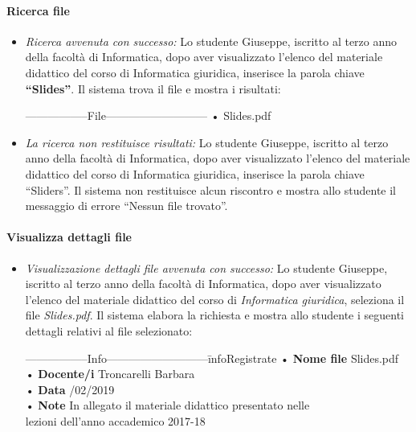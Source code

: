 \paragraph{Ricerca file}
\begin{itemize}
	\item \textit{Ricerca avvenuta con successo:}
	Lo studente Giuseppe, iscritto al terzo anno della  facoltà di Informatica, dopo aver visualizzato l’elenco del materiale didattico del corso di Informatica giuridica, inserisce la parola chiave \textbf{“Slides”}. Il sistema trova il file e mostra i risultati:   
	\begin{tabbing}
		\hspace{1cm}-----------------File---------------------------\kill
		\hspace{1cm} • Slides.pdf  \\
	\end{tabbing} 
	
	\item \textit{La ricerca non restituisce risultati:}
	Lo studente Giuseppe, iscritto al terzo anno della facoltà di Informatica, dopo aver visualizzato l’elenco del materiale didattico del corso di Informatica giuridica, inserisce la parola chiave “Sliders”. Il sistema non restituisce alcun riscontro e mostra allo studente il messaggio di errore “Nessun file trovato”.
\end{itemize}

\paragraph{Visualizza dettagli file}
\begin{itemize}
	\item \textit{Visualizzazione dettagli file avvenuta con successo:}
	Lo studente Giuseppe, iscritto al terzo anno della facoltà di Informatica, dopo aver visualizzato l’elenco del materiale didattico del corso di \textit{Informatica giuridica}, seleziona il file \textit{Slides.pdf}. Il sistema elabora la richiesta e mostra allo studente i seguenti dettagli relativi al file selezionato:
	\begin{tabbing}
		\hspace{1cm}-----------------Info---------------------------\= infoRegistrate\kill
		\hspace{1cm} • \textbf{Nome file} \> Slides.pdf  \\
		\hspace{1cm} • \textbf{Docente/i} \> Troncarelli Barbara  \\
		\hspace{1cm} • \textbf{Data} /02/2019  \\
		\hspace{1cm} • \textbf{Note} \> In allegato il materiale didattico presentato nelle\\ lezioni dell'anno accademico 2017-18  \\
	\end{tabbing} 
\end{itemize}

